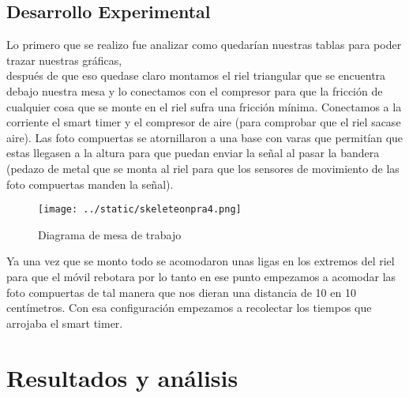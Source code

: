 \documentclass{article}
\begin{document}
\begin{multicols}{2}
\section*{Desarrollo Experimental}\label{Desarrollo experimental}				%

Lo primero que se realizo fue analizar como quedarían nuestras tablas para poder trazar nuestras gráficas,\\
después de que eso quedase claro montamos el riel triangular que se encuentra debajo nuestra mesa y lo conectamos con el compresor para que la fricción de cualquier cosa que se monte en el riel sufra una fricción mínima.
Conectamos a la corriente el smart timer y el compresor de aire (para comprobar que el riel sacase aire). Las foto compuertas se atornillaron a una base con varas que permitían que estas llegasen a la altura para que puedan enviar la señal al pasar la bandera (pedazo de metal que se monta al riel para que los sensores de movimiento de las foto compuertas manden la señal).  

\begin{figure}[H]
	\centering
	\texttt{[image: ../static/skeleteonpra4.png]}
	\caption{Diagrama de mesa de trabajo}
	\label{fig:1}
\end{figure}

Ya una vez que se monto todo se acomodaron unas ligas en los extremos del riel para que el móvil rebotara por lo tanto en ese punto empezamos a acomodar las foto compuertas de tal manera que nos dieran una distancia de 10 en 10 centímetros.
Con esa configuración empezamos a recolectar los tiempos que arrojaba el smart timer.  

\end{multicols}
\section*{Resultados y análisis}\label{Resultados}			%
\end{document}
